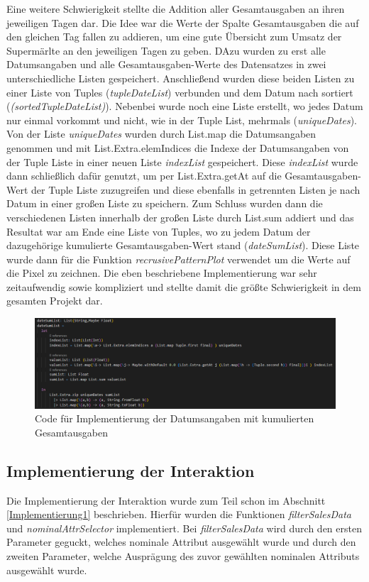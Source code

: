 \documentclass[usegeometry=true]{scrartcl}
\begin{document}
\noindent Eine weitere Schwierigkeit stellte die Addition aller Gesamtausgaben an ihren jeweiligen Tagen dar. Die Idee war die Werte der Spalte Gesamtausgaben die auf den gleichen Tag fallen
zu addieren, um eine gute Übersicht zum Umsatz der Supermärlte an den jeweiligen Tagen zu geben. DAzu wurden zu erst alle Datumsangaben und alle Gesamtausgaben-Werte des Datensatzes
in zwei unterschiedliche Listen gespeichert. Anschließend wurden diese beiden Listen zu einer Liste von Tuples (\textit{tupleDateList}) verbunden und dem Datum nach sortiert
(\textit{(\textit{sortedTupleDateList})}). Nebenbei wurde noch eine Liste erstellt, wo jedes Datum nur einmal vorkommt und nicht, wie in der Tuple List, mehrmals
(\textit{uniqueDates}). Von der Liste \textit{uniqueDates} wurden durch List.map die Datumsangaben genommen und mit List.Extra.elemIndices die Indexe der Datumsangaben von der
Tuple Liste in einer neuen Liste \textit{indexList} gespeichert. Diese \textit{indexList} wurde dann schließlich dafür genutzt, um per List.Extra.getAt auf die Gesamtausgaben-Wert
der Tuple Liste zuzugreifen und diese ebenfalls in getrennten Listen je nach Datum in einer großen Liste zu speichern. Zum Schluss wurden dann die verschiedenen Listen innerhalb
der großen Liste durch List.sum addiert und das Resultat war am Ende eine Liste von Tuples, wo zu jedem Datum der dazugehörige kumulierte Gesamtausgaben-Wert stand
(\textit{dateSumList}). Diese Liste wurde dann für die Funktion \textit{recrusivePatternPlot} verwendet um die Werte auf die Pixel zu zeichnen. Die eben beschriebene Implementierung
war sehr zeitaufwendig sowie kompliziert und stellte damit die größte Schwierigkeit in dem gesamten Projekt dar.

\begin{figure} [H]
	\begin{center}
		\includegraphics[width=17cm]{IMG/dateSumList}
		\caption{Code für Implementierung der Datumsangaben mit kumulierten Gesamtausgaben}
		\label{fig:Datum_Gesamtausgaben}
	\end{center}
\end{figure}

\subsection{Implementierung der Interaktion}
Die Implementierung der Interaktion wurde zum Teil schon im Abschnitt \ref{Implementierung1} beschrieben. Hierfür wurden die Funktionen \textit{filterSalesData} und
\textit{nominalAttrSelector} implementiert. Bei \textit{filterSalesData} wird durch den ersten Parameter geguckt, welches nominale Attribut ausgewählt wurde und durch den zweiten
Parameter, welche Ausprägung des zuvor gewählten nominalen Attributs ausgewählt wurde.
\end{document}
